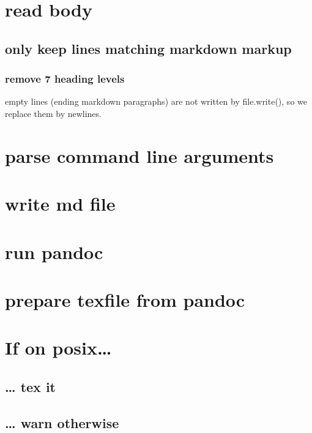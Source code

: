 \documentclass[twoside]{article}
\begin{document}
\section{read body}

\subsection{only keep lines matching markdown markup}

\subsubsection{remove 7 heading levels}

empty lines (ending markdown paragraphs) are not written by
file.write(), so we replace them by newlines.

\section{parse command line arguments}

\section{write md file}

\section{run pandoc}

\section{prepare texfile from pandoc}

\section{If on posix\ldots{}}

\subsection{\ldots{} tex it}

\subsection{\ldots{} warn otherwise}
\end{document}
